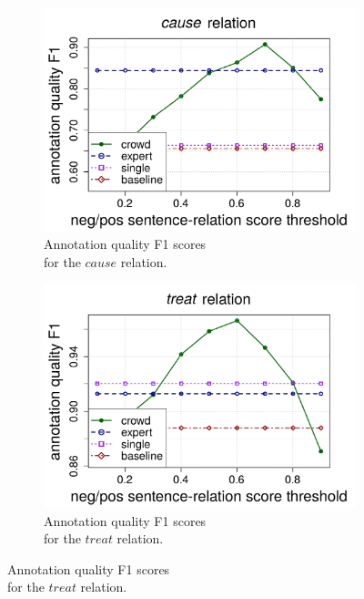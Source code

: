 \begin{figure}[htb!]
\centering

\begin{subfigure}{.5\textwidth}
\includegraphics[width=\linewidth]{img/cause_ann_quality.pdf}
\caption{Annotation quality F1 scores \\ for the $cause$ relation.}
\label{fig:cause_ann_quality}
\end{subfigure}%
\begin{subfigure}{.5\textwidth}
\includegraphics[width=\linewidth]{img/treat_ann_quality.pdf}
\caption{Annotation quality F1 scores \\ for the $treat$ relation.}
\label{fig:treat_ann_quality}
\end{subfigure}
\end{figure}

